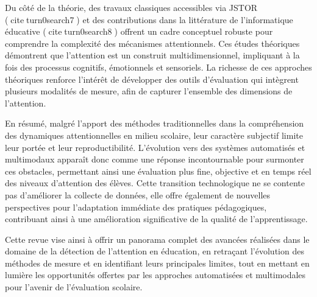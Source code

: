 Du côté de la théorie, des travaux classiques accessibles via JSTOR (citeturn0search7) et des contributions dans la littérature de l’informatique éducative (citeturn0search8) offrent un cadre conceptuel robuste pour comprendre la complexité des mécanismes attentionnels. Ces études théoriques démontrent que l’attention est un construit multidimensionnel, impliquant à la fois des processus cognitifs, émotionnels et sensoriels. La richesse de ces approches théoriques renforce l’intérêt de développer des outils d’évaluation qui intègrent plusieurs modalités de mesure, afin de capturer l’ensemble des dimensions de l’attention.

En résumé, malgré l’apport des méthodes traditionnelles dans la compréhension des dynamiques attentionnelles en milieu scolaire, leur caractère subjectif limite leur portée et leur reproductibilité. L’évolution vers des systèmes automatisés et multimodaux apparaît donc comme une réponse incontournable pour surmonter ces obstacles, permettant ainsi une évaluation plus fine, objective et en temps réel des niveaux d’attention des élèves. Cette transition technologique ne se contente pas d’améliorer la collecte de données, elle offre également de nouvelles perspectives pour l’adaptation immédiate des pratiques pédagogiques, contribuant ainsi à une amélioration significative de la qualité de l’apprentissage.

Cette revue vise ainsi à offrir un panorama complet des avancées réalisées dans le domaine de la détection de l’attention en éducation, en retraçant l’évolution des méthodes de mesure et en identifiant leurs principales limites, tout en mettant en lumière les opportunités offertes par les approches automatisées et multimodales pour l’avenir de l’évaluation scolaire.